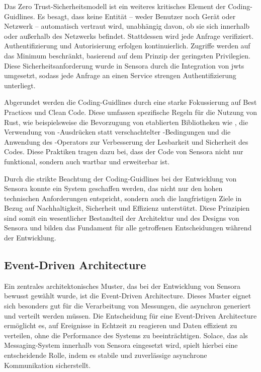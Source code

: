 Das Zero Trust-Sicherheitsmodell ist ein weiteres kritisches Element der Coding-Guidlines. Es besagt, dass keine Entität – weder Benutzer noch Gerät oder Netzwerk – automatisch vertraut wird, unabhängig davon, ob sie sich innerhalb oder außerhalb des Netzwerks befindet. Stattdessen wird jede Anfrage verifiziert. Authentifizierung und Autorisierung erfolgen kontinuierlich. Zugriffe werden auf das Minimum beschränkt, basierend auf dem Prinzip der geringsten Privilegien. Diese Sicherheitsanforderung wurde in Sensora durch die Integration von \acp{jwt} umgesetzt, sodass jede Anfrage an einen Service strengen Authentifizierung unterliegt.

Abgerundet werden die Coding-Guidlines durch eine starke Fokussierung auf Best Practices und Clean Code. Diese umfassen spezifische Regeln für die Nutzung von Rust, wie beispielsweise die Bevorzugung von etablierten Bibliotheken wie , die Verwendung von -Ausdrücken statt verschachtelter -Bedingungen und die Anwendung des -Operators zur Verbesserung der Lesbarkeit und Sicherheit des Codes. Diese Praktiken tragen dazu bei, dass der Code von Sensora nicht nur funktional, sondern auch wartbar und erweiterbar ist.

Durch die strikte Beachtung der Coding-Guidlines bei der Entwicklung von Sensora konnte ein System geschaffen werden, das nicht nur den hohen technischen Anforderungen entspricht, sondern auch die langfristigen Ziele in Bezug auf Nachhaltigkeit, Sicherheit und Effizienz unterstützt. Diese Prinzipien sind somit ein wesentlicher Bestandteil der Architektur und des Designs von Sensora und bilden das Fundament für alle getroffenen Entscheidungen während der Entwicklung.

\subsection{Event-Driven Architecture}
Ein zentrales architektonisches Muster, das bei der Entwicklung von Sensora bewusst gewählt wurde, ist die Event-Driven Architecture. Dieses Muster eignet sich besonders gut für die Verarbeitung von Messungen, die asynchron generiert und verteilt werden müssen. Die Entscheidung für eine Event-Driven Architecture ermöglicht es, auf Ereignisse in Echtzeit zu reagieren und Daten effizient zu verteilen, ohne die Performance des Systems zu beeinträchtigen. Solace, das als Messaging-System innerhalb von Sensora eingesetzt wird, spielt hierbei eine entscheidende Rolle, indem es stabile und zuverlässige asynchrone Kommunikation sicherstellt.


